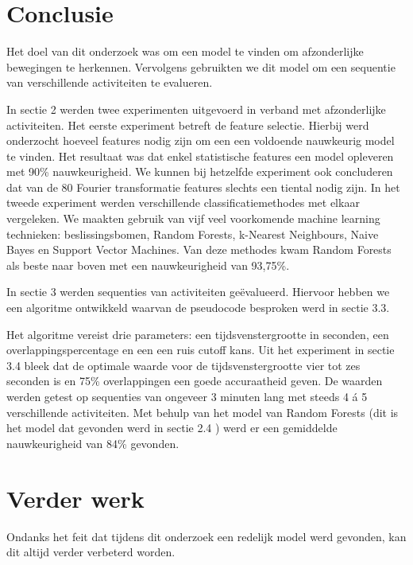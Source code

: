 \documentclass{article}
\begin{document}
	

\section{Conclusie}

Het doel van dit onderzoek was om een model te vinden om afzonderlijke bewegingen te herkennen. Vervolgens gebruikten we dit model om een sequentie van verschillende activiteiten te evalueren.

	In sectie 2 werden twee experimenten uitgevoerd in verband met afzonderlijke activiteiten. Het eerste experiment betreft de feature selectie. Hierbij werd onderzocht hoeveel features nodig zijn om een een voldoende nauwkeurig model te vinden. Het resultaat was dat enkel statistische features een model opleveren met 90\% nauwkeurigheid. We kunnen bij hetzelfde experiment ook concluderen dat van de 80 Fourier transformatie features slechts een tiental nodig zijn.
	In het tweede experiment werden verschillende classificatiemethodes met elkaar vergeleken. We maakten gebruik van vijf veel voorkomende machine learning technieken: beslissingsbomen, Random Forests, k-Nearest Neighbours, Naive Bayes en Support Vector Machines. Van deze methodes kwam Random Forests als beste naar boven met een nauwkeurigheid van 93,75\%.
	
	In sectie 3 werden sequenties van activiteiten ge\"evalueerd. Hiervoor hebben we een algoritme ontwikkeld waarvan de pseudocode besproken werd in sectie 3.3. 

Het algoritme vereist drie parameters: een tijdsvenstergrootte in seconden, een overlappingspercentage en een een ruis cutoff kans. Uit het experiment in sectie 3.4
bleek dat de optimale waarde voor de tijdsvenstergrootte vier tot zes seconden is en 75\% overlappingen een goede accuraatheid geven. De waarden werden getest op sequenties van ongeveer 3 minuten lang met steeds 4 \'a 5 verschillende activiteiten. Met behulp van het model van Random Forests (dit is het model dat gevonden werd in sectie 2.4
) werd er een gemiddelde nauwkeurigheid van 84\% gevonden.



\section{Verder werk}

Ondanks het feit dat tijdens dit onderzoek een redelijk model werd gevonden, kan dit altijd verder verbeterd worden.
\end{document}
